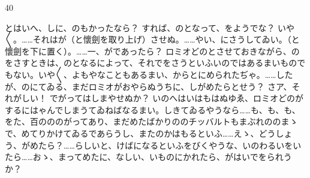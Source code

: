 \documentclass[tate,paper=b6j,jafontsize=9pt]{jlreq}
\begin{document}
\begin{azconvIndented}{4\zw}{0\zw}

とはいへ、しに、のもかったなら？ すれば、のとなって、をようでな？ いや{〳〵}。……それはが（と懷劍を取り上げ）させぬ。……やい、にさうしてゐい。（と懷劍を下に置く）。……一、がであったら？ ロミオどのとさせておきながら、のをさすときは、のとなるによって、それでをさうといふいのではあるまいものでもない。いや{〳〵}、よもやなこともあるまい、からとにめられたぢゃ。……したが、のにてゐる、まだロミオがおやらぬうちに、しがめたらとせう？ さア、それがしい！ でがってはしまやせぬか？ いのへはいはもはぬゆゑ、ロミオどのがするにはゃんでしまうてゐねばなるまい。しきてゐるやうなら……も、も、も、をた、百のののがってあり、まだめたばかりののチッバルトもまぶれののまゝで、めてりかけてゐるであらうし、またのかはもるといふ……えゝ、どうしょう、がめたら？……らしいと、けばになるといふをびくやうな、いのわるいをいたら……おゝ、まってめたに、なしい、いものにかれたら、がはいでをられうか？ 
\end{azconvIndented}
\end{document}
